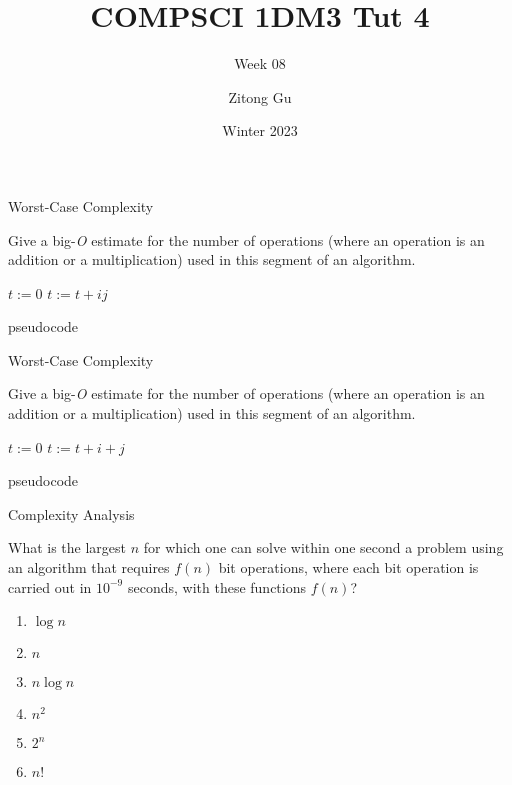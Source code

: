 \documentclass{beamer}
\title{COMPSCI 1DM3 Tut 4}
\subtitle{Week 08}
\author{Zitong Gu}
\institute{McMaster University}
\date{Winter 2023}
\begin{document}
\frame{\titlepage}

\begin{frame}[t]{Worst-Case Complexity}
    \begin{example}
        Give a big-\textit{O} estimate for the number of operations (where an operation is an addition or a multiplication) used in this segment of an algorithm. \begin{algorithm}[H]
            \begin{algorithmic}[1]
                \STATE $t := 0$
                    \STATE $t := t + ij$
                \ENDFOR
                \ENDFOR
            \end{algorithmic}
        \caption{pseudocode}
        \end{algorithm}
        \vspace{2mm}
    \end{example}
\end{frame}

\begin{frame}[t]{Worst-Case Complexity}
    \begin{example}
        Give a big-\textit{O} estimate for the number of operations (where an operation is an addition or a multiplication) used in this segment of an algorithm. \begin{algorithm}[H]
            \begin{algorithmic}[1]
                \STATE $t := 0$
                    \STATE $t := t + i + j$
                \ENDFOR
                \ENDFOR
            \end{algorithmic}
        \caption{pseudocode}
        \end{algorithm}
        \vspace{2mm}
    \end{example}
\end{frame}

\begin{frame}[t]{Complexity Analysis}
    \begin{example}
        What is the largest $n$ for which one can solve within one second a problem using an algorithm that requires $f(n)$ bit operations, where each bit operation is carried out in $10^{-9}$ seconds, with these functions $f(n)$? \begin{enumerate}
            \item $\log{n}$
            \item $n$
            \item $n\log{n}$
            \item $n^2$
            \item $2^n$
            \item $n!$
        \end{enumerate}
    \end{example}
\end{frame}
\end{document}
